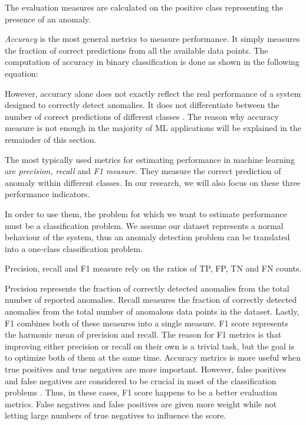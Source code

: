  The evaluation measures are calculated on the positive class representing the presence of an anomaly.
 
\textit{Accuracy} is the most general metrics to measure performance. It simply measures the fraction of correct predictions from all the available data points. The computation of accuracy in binary classification is done as shown in the following equation:


However, accuracy alone does not exactly reflect the real performance of a system designed to correctly detect anomalies. It does not differentiate between the number of correct predictions of different classes \cite{performanceEvaluation2006}. The reason why accuracy measure is not enough in the majority of ML applications will be explained in the remainder of this section. 

The most typically used metrics for estimating performance in machine learning are \textit{precision, recall} and \textit{F1 measure}. They measure the correct prediction of anomaly within different classes. In our research, we will also focus on these three  performance indicators.

In order to use them, the problem for which we want to estimate performance must be a classification problem. We assume our dataset represents a normal behaviour of the system, thus an anomaly detection problem can be translated into a one-class classification problem. 

Precision, recall and F1 measure rely on the ratios of TP, FP, TN and FN counts. 

Precision represents the fraction of correctly detected anomalies from the total number of reported anomalies. Recall measures the fraction of correctly detected anomalies from the total number of anomalous data points in the dataset. Lastly, F1 combines both of these measures into a single measure. F1 score represents the harmonic mean of precision and recall. The reason for F1 metrics is that improving either precision or recall on their own is a trivial task, but the goal is to optimize both of them at the same time. Accuracy metrics is more useful when true positives and true negatives are more important. However, false positives and false negatives are considered to be crucial in most of the classification problems . Thus, in these cases, F1 score happens to be a  better evaluation metrics. False negatives and false positives are given more weight while not letting large numbers of true negatives to influence the score.

